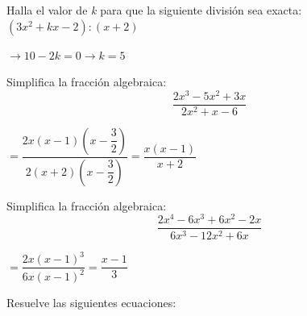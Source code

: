 \documentclass[addpoints,spanish, 12pt,a4paper]{exam}
\begin{document}
\begin{questions}
\addpoints


\question[1] Halla el valor de \emph{k} para que la siguiente división sea exacta: $(3x^2+kx-2):(x+2)$
\begin{solution} $\to 10-2k=0 \to k=5 $ \end{solution}

\addpoints

\question[1] Simplifica la fracción algebraica: $$\dfrac{2x^3-5x^2+3x}{2x^2+x-6} $$
\begin{solution}$=\dfrac{2x\left(x-1\right)\left(x-\dfrac{3}{2}\right)}{2\left(x+2\right)\left(x-\dfrac{3}{2}\right)}=\dfrac{x(x-1)}{x+2}$  \end{solution}

\addpoints

\question[1] Simplifica la fracción algebraica: $$\dfrac{2x^4-6x^3+6x^2-2x}{6x^3-12x^2+6x} $$
\begin{solution}$=\dfrac{2x\left(x-1\right)^3}{6x\left(x-1\right)^2}=\dfrac{x-1}{3}$ \end{solution}

\addpoints

\question Resuelve las siguientes ecuaciones: 
\end{questions}
\end{document}
